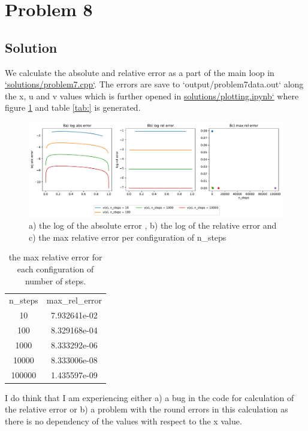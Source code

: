 \documentclass[final, 3p, times, 11.5pt]{article}
\begin{document}
\section*{Problem 8}

\subsection{Solution}

We calculate the absolute and relative error as a part of the main loop in \href{https://github.com/Johannesfjeldsaa/FYS3150/blob/Project1/Project1/solutions/problem7.cpp}{`solutions/problem7.cpp`}. The errors are save to `output/problem7data.out` along the x, u and v values which is further opened in \href{https://github.com/Johannesfjeldsaa/FYS3150/blob/Project1/Project1/solutions/plotting.ipynb}{solutions/plotting.ipynb`} where figure \ref{fig:problem8} and table \ref{tab:} is generated.

\begin{figure}[h!]
    \centering
    \includegraphics[width=0.8\linewidth]{Project 1/Figurer/problem8fig.pdf}
    \caption{a) the log of the absolute error , b) the log of the relative error and c) the max relative error per configuration of n_steps}
    \label{fig:problem8}
\end{figure}


\begin{table}[h!]
    \centering
    \caption{the max relative error for each configuration of number of steps. }
    \begin{tabular}{cc}
        n\_steps & max\_rel\_error\\
        10 & 7.932641e-02\\
        100 & 8.329168e-04\\
        1000 & 8.333292e-06\\
        10000  & 8.333006e-08\\
        100000 &  1.435597e-09
    \end{tabular}
    \label{tab:my_label}
\end{table}
 
I do think that I am experiencing either a) a bug in the code for calculation of the relative error or b) a problem with the round errors in this calculation as there is no dependency of the values with respect to the x value. 
\end{document}
